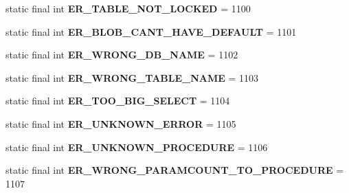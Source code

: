 \begin{DoxyCompactItemize}
static final int {\bfseries E\+R\+\_\+\+T\+A\+B\+L\+E\+\_\+\+N\+O\+T\+\_\+\+L\+O\+C\+K\+ED} = 1100
\item 
\mbox{\label{classcom_1_1mysql_1_1jdbc_1_1_mysql_error_numbers_a24e6049d82f1347abbe7cc65deac4f5d}} 
static final int {\bfseries E\+R\+\_\+\+B\+L\+O\+B\+\_\+\+C\+A\+N\+T\+\_\+\+H\+A\+V\+E\+\_\+\+D\+E\+F\+A\+U\+LT} = 1101
\item 
\mbox{\label{classcom_1_1mysql_1_1jdbc_1_1_mysql_error_numbers_a44e376a5dd271d23d62fbffc53bc914f}} 
static final int {\bfseries E\+R\+\_\+\+W\+R\+O\+N\+G\+\_\+\+D\+B\+\_\+\+N\+A\+ME} = 1102
\item 
\mbox{\label{classcom_1_1mysql_1_1jdbc_1_1_mysql_error_numbers_a208c1c95980f02073d3a322131b9da8f}} 
static final int {\bfseries E\+R\+\_\+\+W\+R\+O\+N\+G\+\_\+\+T\+A\+B\+L\+E\+\_\+\+N\+A\+ME} = 1103
\item 
\mbox{\label{classcom_1_1mysql_1_1jdbc_1_1_mysql_error_numbers_a2015bbf2f9a8e3ce18dfde39b79611ad}} 
static final int {\bfseries E\+R\+\_\+\+T\+O\+O\+\_\+\+B\+I\+G\+\_\+\+S\+E\+L\+E\+CT} = 1104
\item 
\mbox{\label{classcom_1_1mysql_1_1jdbc_1_1_mysql_error_numbers_a9a054a3ad29dd2983f8f55602442ed7d}} 
static final int {\bfseries E\+R\+\_\+\+U\+N\+K\+N\+O\+W\+N\+\_\+\+E\+R\+R\+OR} = 1105
\item 
\mbox{\label{classcom_1_1mysql_1_1jdbc_1_1_mysql_error_numbers_ae0959c030ffb864fa8df2d2f14fda234}} 
static final int {\bfseries E\+R\+\_\+\+U\+N\+K\+N\+O\+W\+N\+\_\+\+P\+R\+O\+C\+E\+D\+U\+RE} = 1106
\item 
\mbox{\label{classcom_1_1mysql_1_1jdbc_1_1_mysql_error_numbers_a8a808336f5d786b7951dbd4ccc747b78}} 
static final int {\bfseries E\+R\+\_\+\+W\+R\+O\+N\+G\+\_\+\+P\+A\+R\+A\+M\+C\+O\+U\+N\+T\+\_\+\+T\+O\+\_\+\+P\+R\+O\+C\+E\+D\+U\+RE} = 1107
\item 
\mbox{\label{classcom_1_1mysql_1_1jdbc_1_1_mysql_error_numbers_aaaec46a52bf269037502febe4982109b}} 

\end{DoxyCompactItemize}
